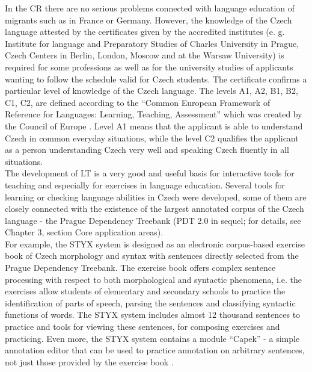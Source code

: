\begin{multicols}{2}
In the CR there are no serious problems connected with language education of migrants such as in France or Germany. However, the knowledge of the Czech language attested by the certificates given by the accredited institutes (e. g. Institute for language and Preparatory Studies of Charles University in Prague, Czech Centers in Berlin, London, Moscow and at the Warsaw University) is required for some professions as well as for the university studies of applicants wanting to follow the schedule valid for Czech students. The certificate confirms a particular level of knowledge of the Czech language.  The levels A1, A2, B1, B2, C1, C2, are defined according to the “Common European Framework of Reference for Languages: Learning, Teaching, Assessment” which was created by the Council of Europe \cite{Note7}. Level A1 means that the applicant is able to understand Czech in common everyday situations, while the level C2 qualifies the applicant as a person understanding Czech very well and speaking Czech fluently in all situations.\\
The development of LT is a very good and useful basis for interactive tools for teaching and especially for exercises in language education. Several tools for learning or checking language abilities in Czech were developed, some of them are closely connected with the existence of the largest annotated corpus of the Czech language - the Prague Dependency Treebank (PDT 2.0 in sequel; for details, see Chapter 3, section Core application areas).\\	
For example, the STYX system is designed as an electronic corpus-based exercise book of Czech morphology and syntax with sentences directly selected from the Prague Dependency Treebank. The exercise book offers complex sentence processing with respect to both morphological and syntactic phenomena, i.e. the exercises allow students of elementary and secondary schools to practice the identification of parts of speech, parsing the sentences and classifying syntactic functions of words. The STYX system includes almost 12 thousand sentences to practice and tools for viewing these sentences, for composing exercises and practicing. Even more, the STYX system contains a module “Capek” - a simple annotation editor that can be used to practice annotation on arbitrary sentences, not just those provided by the exercise book \cite{Note8}.\\

\end{multicols}

